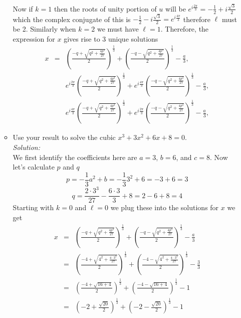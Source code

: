 \documentclass[10pt]{amsart}
\theoremstyle{nonumberplain}
\begin{document}
\begin{enumerate}[label={\bf {\arabic*}:}]
\begin{itemize}
Now if $k=1$ then the roots of unity portion of $u$ will be $e^{i\frac{2\pi}{3}} = -\frac{1}{2} + i\frac{\sqrt{3}}{2}$ which the complex conjugate of this is $-\frac{1}{2} - i\frac{\sqrt{3}}{2} = e^{i\frac{4\pi}{3}}$ therefore $\ell$ must be 2.
Similarly when $k=2$ we must have $\ell = 1$.
Therefore, the expression for $x$ gives rise to 3 unique solutions
\begin{eqnarray*}
x &=& \left(\frac{-q + \sqrt{q^2 + \frac{4p^3}{27}}}{2}\right)^{\frac{1}{3}} + \left(\frac{-q - \sqrt{q^2 + \frac{4p^3}{27}}}{2}\right)^{\frac{1}{3}} -\frac{a}{3}, \\
&& e^{i\frac{2\pi}{3}} \left(\frac{-q + \sqrt{q^2 + \frac{4p^3}{27}}}{2}\right)^{\frac{1}{3}} + e^{i\frac{4\pi}{3}} \left(\frac{-q - \sqrt{q^2 + \frac{4p^3}{27}}}{2}\right)^{\frac{1}{3}} -\frac{a}{3}, \\
&& e^{i\frac{4\pi}{3}} \left(\frac{-q + \sqrt{q^2 + \frac{4p^3}{27}}}{2}\right)^{\frac{1}{3}} + e^{i\frac{2\pi}{3}} \left(\frac{-q - \sqrt{q^2 + \frac{4p^3}{27}}}{2}\right)^{\frac{1}{3}} -\frac{a}{3},
\end{eqnarray*}

\item Use your result to solve the cubic $x^3+3 x^2+6 x+8=0$. \\
\textit{Solution:} \\
We first identify the coefficients here are $a=3$, $b=6$, and $c=8$.
Now let's calculate $p$ and $q$
$$p = -\frac{1}{3}a^2 + b = -\frac{1}{3}3^2 + 6 = - 3 + 6 = 3$$
$$q = \frac{2 \cdot 3^3}{27} - \frac{6 \cdot 3}{3} + 8 = 2 - 6 + 8 = 4$$
Starting with $k = 0$ and $\ell = 0$ we plug these into the solutions for $x$ we get
\begin{eqnarray*}
x &=& \left(\frac{-q + \sqrt{q^2 + \frac{4p^3}{27}}}{2}\right)^{\frac{1}{3}} + \left(\frac{-q - \sqrt{q^2 + \frac{4p^3}{27}}}{2}\right)^{\frac{1}{3}} -\frac{a}{3} \\
   &=& \left(\frac{-4 + \sqrt{4^2 + \frac{4 \cdot 3^3}{27}}}{2}\right)^{\frac{1}{3}} + \left(\frac{-4 - \sqrt{4^2 + \frac{4 \cdot 3^3}{27}}}{2}\right)^{\frac{1}{3}} -\frac{3}{3} \\
   &=& \left(\frac{-4 + \sqrt{16 + 4}}{2}\right)^{\frac{1}{3}} + \left(\frac{-4 - \sqrt{16 + 4}}{2}\right)^{\frac{1}{3}} -1 \\
   &=& \left( - 2 + \frac{\sqrt{20}}{2}\right)^{\frac{1}{3}} + \left(- 2 - \frac{\sqrt{20}}{2}\right)^{\frac{1}{3}} -1 \\
\end{eqnarray*}


\end{itemize}
\end{enumerate}
\end{document}
